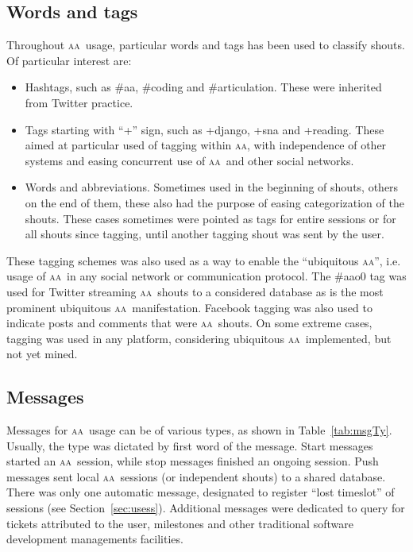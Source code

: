 \documentclass[a4paper, 11pt]{article} %
\newcommand{\aab}{\textsc{aa}}
\begin{document}
\subsection{Words and tags}\label{sec:usewt}
Throughout \aab\ usage, particular words and tags has been used to classify shouts. Of particular interest are:
\begin{itemize}
    \item Hashtags, such as \#aa, \#coding and \#articulation. These were inherited from Twitter practice. 
    \item Tags starting with ``+'' sign, such as +django, +sna and +reading. These aimed at particular used of tagging within \aab, with independence of other systems and easing concurrent use of \aab\ and other social networks.
    \item Words and abbreviations. Sometimes used in the beginning of shouts, others on the end of them, these also had the purpose of easing categorization of the shouts. These cases sometimes were pointed as tags for entire sessions or for all shouts since tagging, until another tagging shout was sent by the user.
\end{itemize}

These tagging schemes was also used as a way to enable the ``ubiquitous \aab'', i.e. usage of \aab\ in any social network or communication protocol. The \#aao0 tag was used for Twitter streaming \aab\ shouts to a considered database as is the most prominent ubiquitous \aab\ manifestation. Facebook tagging was also used to indicate posts and comments that were \aab\ shouts. On some extreme cases, tagging was used in any platform, considering ubiquitous \aab\ implemented, but not yet mined.

\subsection{Messages}\label{sec:usesh}
Messages for \aab\ usage can be of various types, as shown in Table~\ref{tab:msgTy}. Usually, the type was dictated by first word of the message. Start messages started an \aab\ session, while stop messages finished an ongoing session. Push messages sent local \aab\ sessions (or independent shouts) to a shared database. There was only one automatic message, designated to register ``lost timeslot'' of sessions (see Section~\ref{sec:usess}). Additional messages were dedicated to query for tickets attributed to the user, milestones and other traditional software development managements facilities.
\end{document}
